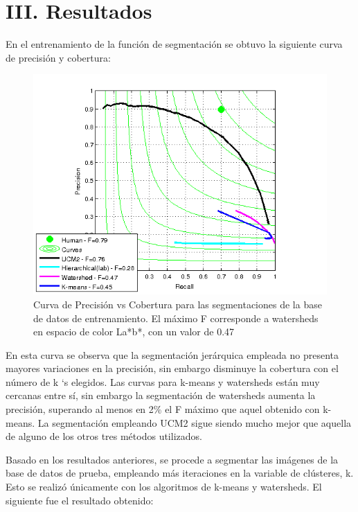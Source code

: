 \documentclass[10pt,twocolumn,letterpaper]{article}
\begin{document}
\section{\textbf{ III. Resultados}}
En el entrenamiento de la función de segmentación se obtuvo la siguiente curva de precisión y cobertura:
\begin{figure}[H]
\begin{center}
   \includegraphics[scale = 0.65]{curves_1}
\end{center}
   \caption{Curva de Precisión vs Cobertura para las segmentaciones de la base de datos de entrenamiento. El máximo F corresponde a watersheds en espacio de color La*b*, con un valor de 0.47}
\end{figure}

En esta curva se observa que la segmentación jerárquica empleada no presenta mayores variaciones en la precisión, sin embargo disminuye la cobertura con el número de k ‘s elegidos. Las curvas para k-means y watersheds están muy cercanas entre sí, sin embargo la segmentación de watersheds aumenta la precisión, superando al menos en 2\% el F máximo que aquel obtenido con k-means. La segmentación empleando UCM2 sigue siendo mucho mejor que aquella de alguno de los otros tres métodos utilizados.

Basado en los resultados anteriores, se procede a segmentar las imágenes de la base de datos de prueba, empleando más iteraciones en la variable de clústeres, k. Esto se realizó únicamente con los algoritmos de k-means y watersheds. El siguiente fue el resultado obtenido:
\end{document}
